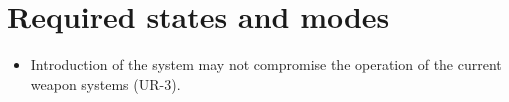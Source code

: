 \documentclass[Main]{subfiles}
\begin{document}
\section{Required states and modes}
\begin{itemize}
\item Introduction of the system may not compromise the operation of the current weapon systems (UR-3).
\end{itemize}
\end{document}
